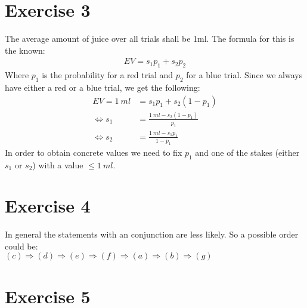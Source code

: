 \documentclass{article}
\begin{document}
\section*{Exercise 3}
The average amount of juice over all trials shall be 1ml. The formula for this is the known:
\begin{align}
EV = s_1 p_1 + s_2 p_2
\end{align}
Where $p_1$ is the probability for a red trial and $p_2$ for a blue trial. Since we always have either a red or a blue trial, we get the following:
\begin{align}
EV = 1 \  ml &= s_1 p_1 + s_2 (1 - p_1)\\
\Leftrightarrow s_1 &= \frac{1 \  ml - s_2 (1 - p_1)}{p_1}\\
\Leftrightarrow s_2 &= \frac{1 \  ml - s_1 p_1}{1 - p_1}
\end{align}
In order to obtain concrete values we need to fix $p_1$ and one of the stakes (either $s_1$ or $s_2$) with a value $\leq 1 \  ml$.


\section*{Exercise 4}
In general the statements with an conjunction are less likely. So a possible order could be:\\
$(c)\Rightarrow(d)\Rightarrow(e)\Rightarrow(f)\Rightarrow(a)\Rightarrow(b)\Rightarrow(g)$


\section*{Exercise 5}

\end{document}
